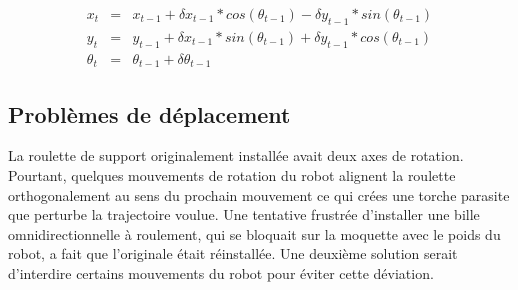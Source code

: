 \begin{equation*}
	\begin{array}{rcl}
		x_t &=& x_{t-1} + \delta x_{t-1} * cos(\theta_{t-1}) - \delta y_{t-1} * sin(\theta_{t-1}) \\
		y_t &=& y_{t-1} + \delta x_{t-1} * sin(\theta_{t-1}) + \delta y_{t-1} * cos(\theta_{t-1}) \\
		\theta_t &=& \theta_{t-1} + \delta\theta_{t-1}
	\end{array}
\end{equation*}
\subsection{Problèmes de déplacement}


La roulette de support originalement installée avait deux axes de
rotation. Pourtant, quelques mouvements de rotation du robot alignent
la roulette orthogonalement au sens du prochain mouvement ce qui crées
une torche parasite que perturbe la trajectoire voulue. Une tentative
frustrée d'installer une bille omnidirectionnelle à roulement, qui se
bloquait sur la moquette avec le poids du robot, a fait que
l'originale était réinstallée. Une deuxième solution serait d'interdire
certains mouvements du robot pour éviter cette déviation.


